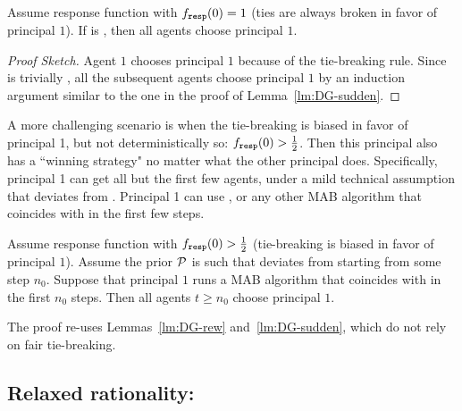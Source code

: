 \begin{theorem}\label{thm:HardMax-hardTies}
Assume \HardMax response function with $f_{\mathtt{resp}}(0)=1$ (ties are always broken in favor of principal $1$). If \alg[1] is \StaticGreedy, then all agents choose principal $1$.
\end{theorem}

\begin{proof}[Proof Sketch]
Agent $1$ chooses principal $1$ because of the tie-breaking rule. Since \StaticGreedy is trivially \bmonotone, all the subsequent agents choose principal $1$ by an induction argument similar to the one in the proof of Lemma~\ref{lm:DG-sudden}.
\end{proof}



A more challenging scenario is when the tie-breaking is biased in favor of principal 1, but not deterministically so: $f_{\mathtt{resp}}(0)>\tfrac12$. Then this principal also has a ``winning strategy" no matter what the other principal does. Specifically, principal 1 can get all but the first few agents, under a mild technical assumption that \DynGreedy deviates from \StaticGreedy. Principal 1 can use \DynGreedy, or any other \bmonotone MAB algorithm that coincides with \DynGreedy in the first few steps.



\begin{theorem}\label{thm:HardMax-biased}
Assume \HardMax response function with $f_{\mathtt{resp}}(0)>\tfrac12$ (\ie tie-breaking is biased in favor of principal $1$). Assume the prior $\mathcal{P}$ is such that \DynGreedy deviates from \StaticGreedy starting from some step $n_0$. Suppose that principal $1$ runs a \bmonotone MAB algorithm that coincides with \DynGreedy in the first $n_0$ steps. Then all agents $t\geq n_0$ choose principal $1$.
\end{theorem}

The proof re-uses Lemmas~\ref{lm:DG-rew} and~\ref{lm:DG-sudden}, which do not rely on fair tie-breaking.



\subsection{Relaxed rationality: \HardMaxRandom}
\label{sec:theory-HMR}

